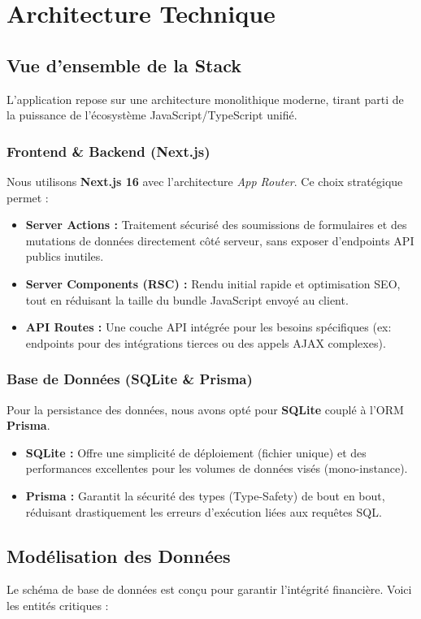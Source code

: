 \chapter{Architecture Technique}

\section{Vue d'ensemble de la Stack}
L'application \textbf{\projectName} repose sur une architecture monolithique moderne, tirant parti de la puissance de l'écosystème JavaScript/TypeScript unifié.

\subsection{Frontend \& Backend (Next.js)}
Nous utilisons \textbf{Next.js 16} avec l'architecture \textit{App Router}. Ce choix stratégique permet :
\begin{itemize}
    \item \textbf{Server Actions :} Traitement sécurisé des soumissions de formulaires et des mutations de données directement côté serveur, sans exposer d'endpoints API publics inutiles.
    \item \textbf{Server Components (RSC) :} Rendu initial rapide et optimisation SEO, tout en réduisant la taille du bundle JavaScript envoyé au client.
    \item \textbf{API Routes :} Une couche API intégrée pour les besoins spécifiques (ex: endpoints pour des intégrations tierces ou des appels AJAX complexes).
\end{itemize}

\subsection{Base de Données (SQLite \& Prisma)}
Pour la persistance des données, nous avons opté pour \textbf{SQLite} couplé à l'ORM \textbf{Prisma}.
\begin{itemize}
    \item \textbf{SQLite :} Offre une simplicité de déploiement (fichier unique) et des performances excellentes pour les volumes de données visés (mono-instance).
    \item \textbf{Prisma :} Garantit la sécurité des types (Type-Safety) de bout en bout, réduisant drastiquement les erreurs d'exécution liées aux requêtes SQL.
\end{itemize}

\section{Modélisation des Données}
Le schéma de base de données est conçu pour garantir l'intégrité financière. Voici les entités critiques :


